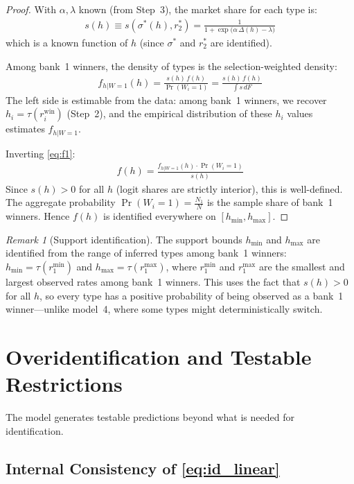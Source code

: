 \documentclass[12pt]{article}
\theoremstyle{plain}
\theoremstyle{plain}
\theoremstyle{definition}  %
\theoremstyle{remark}  %
\newtheorem{remark}[thm]{Remark}  %
\begin{document}
\begin{proof}
With $\alpha, \lambda$ known (from Step~3), the market share for each type is:
\begin{align}\label{eq:s_known}
    s(h) \equiv s(\sigma^*(h), r_2^*) = \frac{1}{1 + \exp\!\big(\alpha\,\Delta(h) - \lambda\big)}
\end{align}
which is a known function of $h$ (since $\sigma^*$ and $r_2^*$ are identified).

Among bank~1 winners, the density of types is the selection-weighted density:
\begin{align}\label{eq:f1}
    f_{h|W=1}(h) = \frac{s(h)\, f(h)}{\Pr(W_i = 1)} = \frac{s(h)\, f(h)}{\int s\, dF}
\end{align}
The left side is estimable from the data: among bank~1 winners, we recover $h_i = \tau(r_i^{\text{win}})$ (Step~2), and the empirical distribution of these $h_i$ values estimates $f_{h|W=1}$.

Inverting \eqref{eq:f1}:
\begin{align}\label{eq:f_recovered}
    f(h) = \frac{f_{h|W=1}(h) \cdot \Pr(W_i = 1)}{s(h)}
\end{align}
Since $s(h) > 0$ for all $h$ (logit shares are strictly interior), this is well-defined. The aggregate probability $\Pr(W_i = 1) = \frac{N_1}{N}$ is the sample share of bank~1 winners. Hence $f(h)$ is identified everywhere on $[h_{\min}, h_{\max}]$.
\end{proof}

\begin{remark}[Support identification]
The support bounds $h_{\min}$ and $h_{\max}$ are identified from the range of inferred types among bank~1 winners: $h_{\min} = \tau(r_1^{\min})$ and $h_{\max} = \tau(r_1^{\max})$, where $r_1^{\min}$ and $r_1^{\max}$ are the smallest and largest observed rates among bank~1 winners. This uses the fact that $s(h) > 0$ for all $h$, so every type has a positive probability of being observed as a bank~1 winner---unlike model~4, where some types might deterministically switch.
\end{remark}


\section{Overidentification and Testable Restrictions}\label{sec:overid}

The model generates testable predictions beyond what is needed for identification.

\subsection{Internal Consistency of \eqref{eq:id_linear}}
\end{document}
